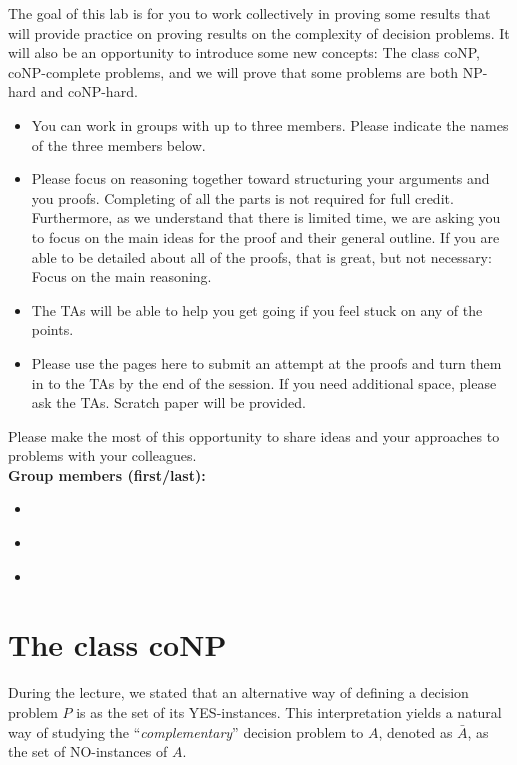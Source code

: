 \documentclass{cs0500}
\begin{document}
\maketitle

The goal of this lab is for you to work collectively in proving some results that will provide practice on proving results on the complexity of decision problems. It will also be an opportunity to introduce some new concepts: The class coNP, coNP-complete problems, and we will prove that some problems are both NP-hard and coNP-hard.
\begin{itemize}
    \item You can work in groups with up to three members. Please indicate the names of the three members below.  
    \item Please focus on reasoning together toward structuring your arguments and you proofs. Completing of all the parts is not required for full credit. Furthermore, as we understand that there is limited time, we are asking you to focus on the main ideas for the proof and their general outline. If you are able to be detailed about all of the proofs, that is great, but not necessary: Focus on the main reasoning.
    \item The TAs will be able to help you get going if you feel stuck on any of the points. 
    \item Please use the pages here to submit an attempt at the proofs and turn them in to the TAs by the end of the session. If you need additional space, please ask the TAs. Scratch paper will be provided.
\end{itemize}
Please make the most of this opportunity to share ideas and your approaches to problems with your colleagues.\\


\vspace{10mm}
\noindent\textbf{Group members (first/last):}
\begin{itemize}
    \item \ 
    \item \ 
    \item \ 
\end{itemize}
\newpage
\section{The class coNP}
During the lecture, we stated that an alternative way of defining a decision problem $P$ is as the set of its YES-instances. This interpretation yields a natural way of studying the ``\emph{complementary}'' decision problem to $A$, denoted as $\bar{A}$, as the set of NO-instances of $A$. 
\end{document}
